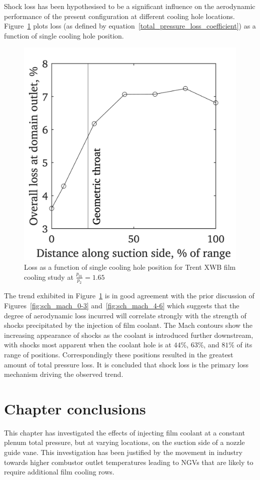 \documentclass[a4paper, 11pt, oneside]{report}
\begin{document}
Shock loss has been hypothesised to be a significant influence on the aerodynamic performance of the present configuration at different cooling hole locations. Figure~\ref{fig:sch_hole_location_vs_loss} plots loss (as defined by equation~\ref{total_pressure_loss_coefficient}) as a function of single cooling hole position.
    
    \begin{figure}[H]
      \centering
      \includegraphics[width=.45\textwidth]{figs/sch_hole_location_vs_loss.png}
      \caption{Loss as a function of single cooling hole position for Trent XWB film cooling study at $\frac{p_{01}}{p_2}=1.65$}
      \label{fig:sch_hole_location_vs_loss}
\end{figure}

The trend exhibited in Figure~\ref{fig:sch_hole_location_vs_loss} is in good agreement with the prior discussion of Figures~\ref{fig:sch_mach_0-3} and~\ref{fig:sch_mach_4-6} which suggests that the degree of aerodynamic loss incurred will correlate strongly with the strength of shocks precipitated by the injection of film coolant. The Mach contours show the increasing appearance of shocks as the coolant is introduced further downstream, with shocks most apparent when the coolant hole is at $44\%$, $63\%$, and $81\%$ of its range of positions. Correspondingly these positions resulted in the greatest amount of total pressure loss. It is concluded that shock loss is the primary loss mechanism driving the observed trend.
    
    
\section{Chapter conclusions}

This chapter has investigated the effects of injecting film coolant at a constant plenum total pressure, but at varying locations, on the suction side of a nozzle guide vane. This investigation has been justified by the movement in industry towards higher combustor outlet temperatures leading to NGVs that are likely to require additional film cooling rows.
\end{document}
